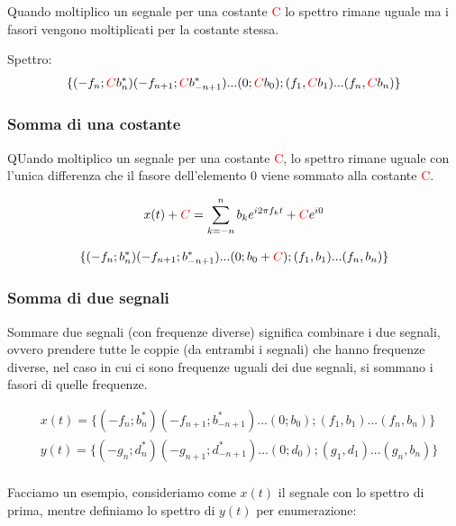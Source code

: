 Quando moltiplico un segnale per una costante \textcolor{red}{C} lo spettro rimane uguale ma i fasori vengono moltiplicati per la costante stessa.

Spettro:
\begin{equation}
    \{ (-f_n; \textcolor{red}{C}b_n^*)(-f_{n+1}; \textcolor{red}{C}b^*_{-n+1}) \mbox{...} (0; \textcolor{red}{C}b_0); (f_1, \textcolor{red}{C}b_1) \mbox{...} (f_n, \textcolor{red}{C}b_n) \}
\end{equation}

\subsubsection{Somma di una costante}
QUando moltiplico un segnale per una costante \textcolor{red}{C}, lo spettro rimane uguale con l'unica differenza che il fasore dell'elemento 0 viene sommato alla costante \textcolor{red}{C}.

\begin{equation}
   x(t) + \textcolor{red}{C} =  \sum_{k = -n}^{n} b_k e^{i 2 \pi f_k t} + \textcolor{red}{C} e^{i 0}
\end{equation}

\begin{equation}
    \{ (-f_n; b_n^*)(-f_{n+1}; b^*_{-n+1}) \mbox{...} (0; b_0 + \textcolor{red}{C}); (f_1, b_1) \mbox{...} (f_n, b_n) \}
\end{equation}

\subsubsection{Somma di due segnali}
Sommare due segnali (con frequenze diverse) significa combinare i due segnali, ovvero prendere tutte le coppie (da entrambi i segnali) che hanno frequenze diverse, nel caso in cui ci sono frequenze uguali dei due segnali, si sommano i fasori di quelle frequenze.

\begin{equation}\begin{split}
    &x(t) = \{ (-f_n; b_n^*)(-f_{n+1}; b^*_{-n+1}) \mbox{...} (0; b_0); (f_1, b_1) \mbox{...} (f_n, b_n) \} \\
    &y(t) = \{ (-g_n; d_n^*)(-g_{n+1}; d^*_{-n+1}) \mbox{...} (0; d_0); (g_1, d_1) \mbox{...} (g_n, b_n) \} \\
\end{split}\end{equation}

Facciamo un esempio, consideriamo come $x(t)$ il segnale con lo spettro di prima, mentre definiamo lo spettro di $y(t)$ per enumerazione:

